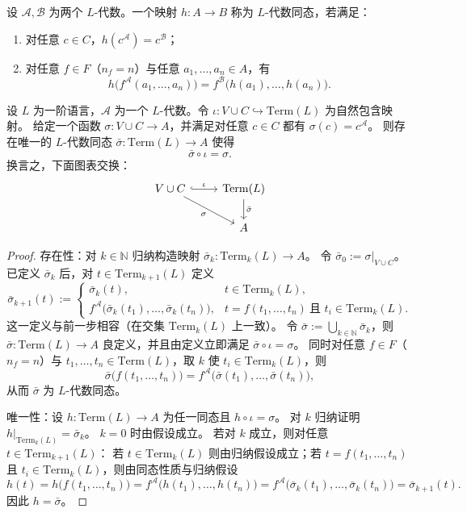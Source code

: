 \documentclass[lang=cn,a4paper,newtx,section]{elegantbook}
\begin{document}
\begin{definition}[$L$-代数同态]
设 $\mathcal A,\mathcal B$ 为两个 $L$-代数。一个映射 $h:A\to B$ 称为 $L$-代数同态，若满足：
\begin{enumerate}
  \item 对任意 $c\in C$，$h(c^{\mathcal A})=c^{\mathcal B}$；
  \item 对任意 $f\in F$（$n_f=n$）与任意 $a_1,\dots,a_n\in A$，有
  \[
    h\bigl(f^{\mathcal A}(a_1,\dots,a_n)\bigr)=f^{\mathcal B}\bigl(h(a_1),\dots,h(a_n)\bigr).
  \]
\end{enumerate}
\end{definition}

\begin{theorem}
设 $L$ 为一阶语言，$\mathcal A$ 为一个 $L$-代数。令 $\iota:V\cup C\hookrightarrow \mathrm{Term}(L)$ 为自然包含映射。
给定一个函数 $\sigma:V\cup C\to A$，并满足对任意 $c\in C$ 都有 $\sigma(c)=c^{\mathcal A}$。
则存在唯一的 $L$-代数同态 $\bar\sigma:\mathrm{Term}(L)\to A$ 使得
\[
  \bar\sigma\circ\iota=\sigma.
\]
换言之，下面图表交换：
\[
\begin{tikzcd}
V\cup C \arrow[r, hook, "\iota"] \arrow[dr, "\sigma"'] & \mathrm{Term}(L) \arrow[d, "\bar\sigma"] \\
& A
\end{tikzcd}
\]
\end{theorem}

\begin{proof}
存在性：对 $k\in\mathbb N$ 归纳构造映射 $\bar\sigma_k:\mathrm{Term}_k(L)\to A$。
令 $\bar\sigma_0:=\sigma\vert_{V\cup C}$。
已定义 $\bar\sigma_k$ 后，对 $t\in\mathrm{Term}_{k+1}(L)$ 定义
\[
  \bar\sigma_{k+1}(t):=
  \begin{cases}
    \bar\sigma_k(t), & t\in\mathrm{Term}_k(L),\\
    f^{\mathcal A}\bigl(\bar\sigma_k(t_1),\dots,\bar\sigma_k(t_n)\bigr), & t=f(t_1,\dots,t_n)\ \text{且 }t_i\in\mathrm{Term}_k(L).
  \end{cases}
\]
这一定义与前一步相容（在交集 $\mathrm{Term}_k(L)$ 上一致）。
令 $\bar\sigma:=\bigcup_{k\in\mathbb N}\bar\sigma_k$，则 $\bar\sigma:\mathrm{Term}(L)\to A$ 良定义，并且由定义立即满足 $\bar\sigma\circ\iota=\sigma$。
同时对任意 $f\in F$（$n_f=n$）与 $t_1,\dots,t_n\in\mathrm{Term}(L)$，取 $k$ 使 $t_i\in\mathrm{Term}_k(L)$，则
\[
  \bar\sigma\bigl(f(t_1,\dots,t_n)\bigr)=f^{\mathcal A}\bigl(\bar\sigma(t_1),\dots,\bar\sigma(t_n)\bigr),
\]
从而 $\bar\sigma$ 为 $L$-代数同态。

唯一性：设 $h:\mathrm{Term}(L)\to A$ 为任一同态且 $h\circ\iota=\sigma$。
对 $k$ 归纳证明 $h\vert_{\mathrm{Term}_k(L)}=\bar\sigma_k$。
$k=0$ 时由假设成立。
若对 $k$ 成立，则对任意 $t\in\mathrm{Term}_{k+1}(L)$：
若 $t\in\mathrm{Term}_k(L)$ 则由归纳假设成立；若 $t=f(t_1,\dots,t_n)$ 且 $t_i\in\mathrm{Term}_k(L)$，则由同态性质与归纳假设
\[
  h(t)=h\bigl(f(t_1,\dots,t_n)\bigr)=f^{\mathcal A}\bigl(h(t_1),\dots,h(t_n)\bigr)=f^{\mathcal A}\bigl(\bar\sigma_k(t_1),\dots,\bar\sigma_k(t_n)\bigr)=\bar\sigma_{k+1}(t).
\]
因此 $h=\bar\sigma$。
\end{proof}
\end{document}

